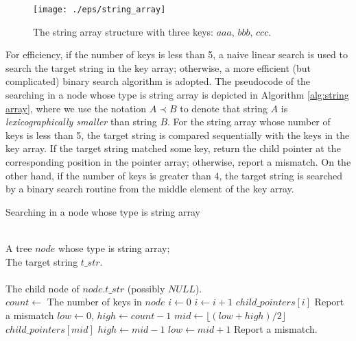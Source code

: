 \documentclass{article}
\begin{document}
\begin{figure}[htbp]
  \centering
  \texttt{[image: ./eps/string\_array]}
  \caption{The string array structure with three keys: $aaa,\, bbb,\,
    ccc$.}
  \label{fig:string array}
\end{figure}

For efficiency, if the number of keys is less than 5, a naive linear
search is used to search the target string in the key array;
otherwise, a more efficient (but complicated) binary search algorithm
is adopted.  The pseudocode of the searching in a node whose type is
string array is depicted in Algorithm \ref{alg:string array}, where we
use the notation $A \prec B$ to denote that string $A$ is
\emph{lexicographically smaller} than string $B$. For the string array
whose number of keys is less than 5, the target string is compared
sequentially with the keys in the key array. If the target string
matched some key, return the child pointer at the corresponding
position in the pointer array; otherwise, report a mismatch. On the
other hand, if the number of keys is greater than 4, the target string
is searched by a binary search routine from the middle element of the
key array.

\begin{algorithm}
  \caption{Searching in a node whose type is string array}\scriptsize
  \label{alg:string array}
  \begin{algorithmic}[1]
    \REQUIRE ~~\\
    A tree $node$ whose type is string array; \\
    The target string $t\_str$.\\
    \ENSURE ~~\\
    The child node of $node.t\_str$ (possibly $NULL$).\\
    \STATE
    \STATE $count \leftarrow$ The number of keys in $node$
    \STATE
    \STATE $i \leftarrow 0$
    \STATE $i \leftarrow i+1$
    \ENDWHILE
    \RETURN $child\_pointers[i]$
    \ELSE
    \STATE Report a mismatch
    \ENDIF
    \ELSE
    \STATE $low \leftarrow 0$, $high \leftarrow count-1$
    \STATE $mid \leftarrow \lfloor (low+high)/2 \rfloor$
    \RETURN $child\_pointers[mid]$
    \STATE $high \leftarrow mid - 1$
    \ELSE
    \STATE $low \leftarrow mid + 1$
    \ENDIF
    \ENDWHILE
    \STATE Report a mismatch.
    \ENDIF
  \end{algorithmic}
\end{algorithm}
\end{document}

